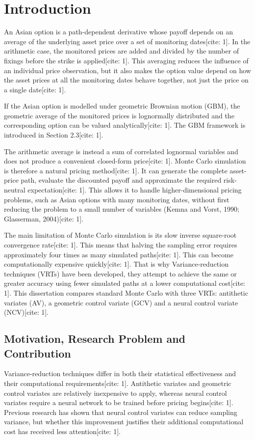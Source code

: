 \chapter{Introduction}
An Asian option is a path-dependent derivative whose payoff depends on an average of the underlying asset price over a set of monitoring dates[cite: 1]. In the arithmetic case, the monitored prices are added and divided by the number of fixings before the strike is applied[cite: 1]. This averaging reduces the influence of an individual price observation, but it also makes the option value depend on how the asset prices at all the monitoring dates behave together, not just the price on a single date[cite: 1].

If the Asian option is modelled under geometric Brownian motion (GBM), the geometric average of the monitored prices is lognormally distributed and the corresponding option can be valued analytically[cite: 1]. The GBM framework is introduced in Section 2.3[cite: 1].

The arithmetic average is instead a sum of correlated lognormal variables and does not produce a convenient closed-form price[cite: 1]. Monte Carlo simulation is therefore a natural pricing method[cite: 1]. It can generate the complete asset-price path, evaluate the discounted payoff and approximate the required risk-neutral expectation[cite: 1]. This allows it to handle higher-dimensional pricing problems, such as Asian options with many monitoring dates, without first reducing the problem to a small number of variables (Kemna and Vorst, 1990; Glasserman, 2004)[cite: 1].

The main limitation of Monte Carlo simulation is its slow inverse square-root convergence rate[cite: 1]. This means that halving the sampling error requires approximately four times as many simulated paths[cite: 1]. This can become computationally expensive quickly[cite: 1]. That is why Variance-reduction techniques (VRTs) have been developed, they attempt to achieve the same or greater accuracy using fewer simulated paths at a lower computational cost[cite: 1]. This dissertation compares standard Monte Carlo with three VRTs: antithetic variates (AV), a geometric control variate (GCV) and a neural control variate (NCV)[cite: 1].

\section{Motivation, Research Problem and Contribution}
Variance-reduction techniques differ in both their statistical effectiveness and their computational requirements[cite: 1]. Antithetic variates and geometric control variates are relatively inexpensive to apply, whereas neural control variates require a neural network to be trained before pricing begins[cite: 1]. Previous research has shown that neural control variates can reduce sampling variance, but whether this improvement justifies their additional computational cost has received less attention[cite: 1].

